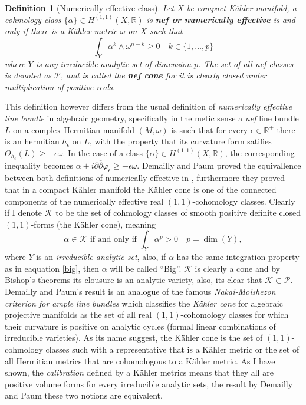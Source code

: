 \documentclass[12pt,twoside,a4paper]{report}
\newtheorem{definition}{Definition}[section]
\newcommand{\re}{\ensuremath{\mathbb R }}
\begin{document}
\begin{definition}[Numerically effective class]
  Let $X$ be compact Kähler manifold, a cohmology class $\{\alpha\}\in H^{(1,1)}(X,\re)$ is {\bf nef or numerically effective} is and only if there is a Kähler metric $\omega$ on $X$ such that
  \begin{equation}
    \int_Y \alpha^k\wedge\omega^{n-k}\geq 0\quad k\in\{1,\dots,p\}
  \end{equation}
  where $Y$ is any irreducible analytic set of dimension $p$. The set of all nef classes is denoted as $\mathcal{P}$, and is called the {\bf nef cone} for it is clearly closed under multiplication of positive reals.
\end{definition}
This definition however differs from the usual definition of \emph{numerically effective line bundle} in algebraic geometry, specifically in the metic sense a \emph{nef} line bundle $L$ on a complex Hermitian manifold $(M,\omega)$ is such that for every $\epsilon\in\re^+$ there is an hermitian $h_{\epsilon}$ on $L$, with the property that its curvature form satifies $\Theta_{h_{\epsilon}}(L)\geq-\epsilon\omega$. In the case of a class $\{\alpha\}\in H^{(1,1)}(X,\re)$, the corresponding inequality becomes $\alpha+i\partial\overline{\partial}\varphi_{\epsilon}\geq-\epsilon\omega$. Demailly and Paum proved the equivallence between both definitions of numerically effective in \cite{Demailly-Paum}, furthermore they proved that in a compact Kähler manifold the Kähler cone is one of the connected components of the numerically effective real $(1,1)$-cohomology classes. Clearly if I denote $\mathcal{K}$ to be the set of cohmology classes of smooth positive definite closed $(1,1)$-forms (the Kähler cone), meaning
\begin{equation}\label{big}
  \alpha\in\mathcal{K}\text{ if and only if }\int_{Y}\alpha^p>0\quad p=\dim(Y),
  \end{equation}
  where $Y$ is an \emph{irreducible analytic set}, also, if \(\alpha\) has the same integration property as in eaquation \ref{big}, then $\alpha$ will be called ``Big''. $\mathcal{K}$ is clearly a cone and by Bishop's theorems its clousure is an analytic variety, also, its clear that $\mathcal{K}\subset\mathcal{P}$. Demailly and Paum's result is an analogue of the famous \emph{Nakai-Moishezon criterion for ample line bundles} which classifies the \emph{Kähler cone} for algebraic projective manifolds as the set of all real $(1,1)$-cohomology classes for which their curvature is positive on analytic cycles (formal linear combinations of irreducible varieties). As its name suggest, the Kähler cone is the set of $(1,1)$-cohmology classes such with a representative that is a Kähler metric or the set of all Hermitian metrics that are cohomologous to a Kähler metric. As I have shown, the \emph{calibration} defined by a Kähler metrics means that they all are positive volume forms for every irreducible analytic sets, the result by Demailly and Paum these two notions are equivalent. 
\end{document}
